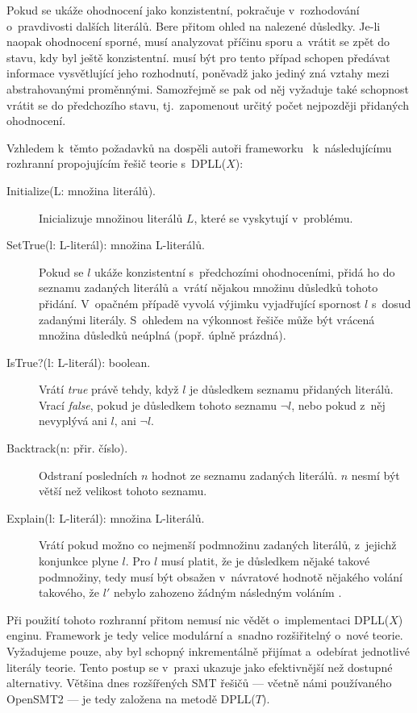 Pokud se ukáže ohodnocení jako konzistentní, pokračuje v~rozhodování o~pravdivosti dalších literálů. Bere přitom ohled na nalezené důsledky. Je-li naopak ohodnocení sporné, musí analyzovat příčinu sporu a~vrátit se zpět do stavu, kdy byl ještě konzistentní. \Solver musí být pro tento případ schopen předávat informace vysvětlující jeho rozhodnutí, poněvadž jako jediný zná vztahy mezi abstrahovanými proměnnými. Samozřejmě se pak od něj vyžaduje také schopnost vrátit se do předchozího stavu, tj.~zapomenout určitý počet nejpozději přidaných ohodnocení.

Vzhledem k~těmto požadavků na \Solver dospěli autoři frameworku~\cite{Gazinger04} k~následujícímu rozhranní propojujícím řešič teorie s~DPLL($X$):

\begin{description}
	\item[Initialize(L: množina literálů).] Inicializuje \Solver množinou literálů $L$, které se vyskytují v~problému.
	\item[SetTrue(l: L-literál): množina L-literálů.] Pokud se $l$ ukáže konzistentní s~předchozími ohodnoceními, přidá ho do seznamu zadaných literálů a~vrátí nějakou množinu důsledků tohoto přidání. V~opačném případě vyvolá výjimku vyjadřující spornost $l$ s~dosud zadanými literály. S~ohledem na výkonnost řešiče může být vrácená množina důsledků neúplná (popř. úplně prázdná).
	\item[IsTrue?(l: L-literál): boolean.] Vrátí \emph{true} právě tehdy, když $l$ je důsledkem seznamu přidaných literálů. Vrací \emph{false}, pokud je důsledkem tohoto seznamu $\neg l$, nebo pokud z~něj nevyplývá ani $l$, ani $\neg l$.
	\item[Backtrack(n: přir. číslo).] Odstraní posledních $n$ hodnot ze seznamu zadaných literálů. $n$ nesmí být větší než velikost tohoto seznamu.
	\item[Explain(l: L-literál): množina L-literálů.] Vrátí pokud možno co nejmenší podmnožinu zadaných literálů, z~jejichž konjunkce plyne $l$. Pro $l$ musí platit, že je důsledkem nějaké takové podmnožiny, tedy musí být obsažen v~návratové hodnotě nějakého volání  takového, že $l'$ nebylo zahozeno žádným následným voláním .
\end{description}

Při použití tohoto rozhranní přitom \Solver nemusí nic vědět o~implementaci DPLL($X$) enginu. Framework je tedy velice modulární a~snadno rozšiřitelný o~nové teorie. Vyžadujeme pouze, aby byl \Solver schopný inkrementálně přijímat a~odebírat jednotlivé literály teorie. Tento postup se v~praxi ukazuje jako efektivnější než dostupné alternativy. Většina dnes rozšířených SMT řešičů --- včetně námi používaného OpenSMT2 --- je tedy založena na metodě DPLL($T$).


